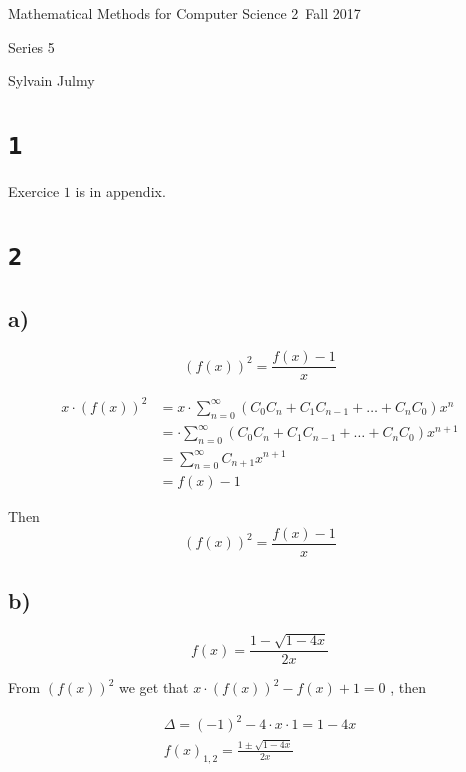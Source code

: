 \documentclass[a4paper,11pt]{report}
\author{Sylvain Julmy}
\date{\today}
\begin{document}
\begin{center}
  \Large{
    Mathematical Methods for Computer Science 2\
    Fall 2017
  }
  \noindent\makebox[\linewidth]{\rule{\linewidth}{0.4pt}}

  Series 5
  \vspace*{1.4cm}

  Sylvain Julmy
  
  \noindent\makebox[\linewidth]{\rule{\linewidth}{0.4pt}}
\end{center}

\section*{\texttt{1}}

Exercice $1$ is in appendix.

\section*{\texttt{2}}

\subsection*{a)}
\[
  (f(x))^2 = \frac{f(x)-1}{x}
\]

\begin{align*}
  x \cdot (f(x))^2 &= x \cdot \sum_{n=0}^{\infty} (C_0C_n + C_1C_{n-1} + \dots + C_nC_0)x^n\\
                   &= \cdot \sum_{n=0}^{\infty} (C_0C_n + C_1C_{n-1} + \dots + C_nC_0)x^{n+1}\\
                   &= \sum_{n=0}^{\infty} C_{n+1}x^{n+1}\\
                   &= f(x)-1
\end{align*}

Then
\[
  (f(x))^2 = \frac{f(x)-1}{x}
\]


\subsection*{b)}
\[
  f(x) = \frac{1 - \sqrt{1-4x}}{2x}
\]

From $(f(x))^2$ we get that $x \cdot (f(x))^2 - f(x) + 1 = 0$ , then

\begin{gather*}
  \Delta = (-1)^2 - 4 \cdot x \cdot 1 = 1 - 4x \\
  f(x)_{1,2} = \frac{1 \pm \sqrt{1-4x}}{2x}
\end{gather*}
\end{document}
